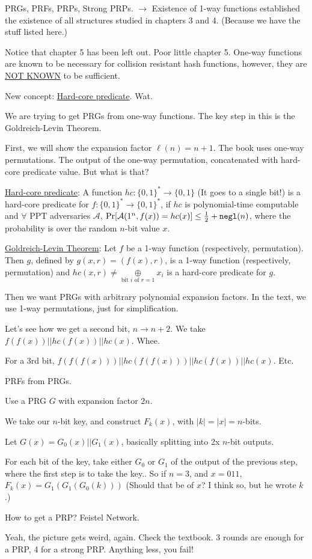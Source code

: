 \documentclass[12pt]{article}
\newcommand{\AAA}{\mathcal{A}}
\newcommand{\xor}{\oplus}
\newcommand{\negl}{{\tt negl}}
\begin{document}
PRGs, PRFs, PRPs, Strong PRPs. $\rightarrow$ Existence of 1-way functions established the existence of all structures studied in chapters 3 and 4. (Because we have the stuff listed here.)

Notice that chapter 5 has been left out. Poor little chapter 5. One-way functions are known to be necessary for collision resistant hash functions, however, they are \underline{NOT KNOWN} to be sufficient.

New concept: \underline{Hard-core predicate}. Wat.

We are trying to get PRGs from one-way functions. The key step in this is the Goldreich-Levin Theorem.

First, we will show the expansion factor $\ell(n)=n+1$. The book uses one-way permutations. The output of the one-way permutation, concatenated with hard-core predicate value. But what is that?

\underline{Hard-core predicate}: A function $hc:\{0,1\}^*\to\{0,1\}$ (It goes to a single bit!) is a hard-core predicate for $f:\{0,1\}^*\to\{0,1\}^*$, if $hc$ is polynomial-time computable and $\forall$ PPT adversaries $\AAA$, $\Pr[\AAA(1^n,f(x))=hc(x)]\leq\frac{1}{2}+\negl(n)$, where the probability is over the random $n$-bit value $x$.

\underline{Goldreich-Levin Theorem}: Let $f$ be a 1-way function (respectively, permutation). Then $g$, defined by $g(x, r)=(f(x),r)$, is a 1-way function (respectively, permutation) and $hc(x,r)\neq\underset{\text{bit }i\text{ of }r=1}{\xor}x_i$ is a hard-core predicate for $g$.

Then we want PRGs with arbitrary polynomial expansion factors. In the text, we use 1-way permutations, just for simplification.

Let's see how we get a second bit, $n\to n+2$. We take $f(f(x))||hc(f(x))||hc(x)$. Whee.

For a 3rd bit, $f(f(f(x)))||hc(f(f(x)))||hc(f(x))||hc(x)$. Etc.

PRFs from PRGs.

Use a PRG $G$ with expansion factor $2n$.

We take our $n$-bit key, and construct $F_k(x)$, with $|k|=|x|=n$-bits.

Let $G(x)=G_0(x)||G_1(x)$, basically splitting into 2x $n$-bit outputs.

For each bit of the key, take either $G_0$ or $G_1$ of the output of the previous step, where the first step is to take the key.. So if $n=3$, and $x=011$, $F_k(x)=G_1(G_1(G_0(k)))$ (Should that be of $x$? I think so, but he wrote $k$.)

How to get a PRP? Feistel Network.

Yeah, the picture gets weird, again. Check the textbook. 3 rounds are enough for a PRP, 4 for a strong PRP. Anything less, you fail! 
\end{document}
